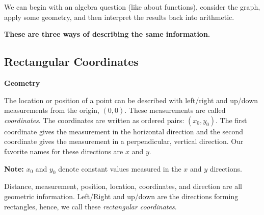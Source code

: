 \documentclass{ximera}
\begin{document}
We can begin with an algebra question (like about functions), consider the graph, apply some geometry, and then interpret the results back into arithmetic.  


\qquad



\textbf{\textcolor{blue!55!black}{These are three ways of describing the same information.}} 

\qquad

\subsection*{Rectangular Coordinates} 

\textbf{\textcolor{purple!85!blue}{Geometry}} 

The location or position of a point can be described with left/right and up/down measurements from the origin, $(0,0)$. These measurements are called \textit{coordinates}.  The coordinates are written as ordered pairs: $(x_0, y_0)$. The first coordinate gives the measurement in the horizontal direction and the second coordinate gives the measurement in a perpendicular, vertical direction.  Our favorite names for these directions are $x$ and $y$. 

\textbf{Note:} $x_0$ and $y_0$ denote constant values measured in the $x$ and $y$ directions. 


Distance, measurement, position, location, coordinates, and direction are all geometric information.  Left/Right and up/down are the directions forming rectangles, hence, we call these \textit{rectangular coordinates}.
\end{document}
